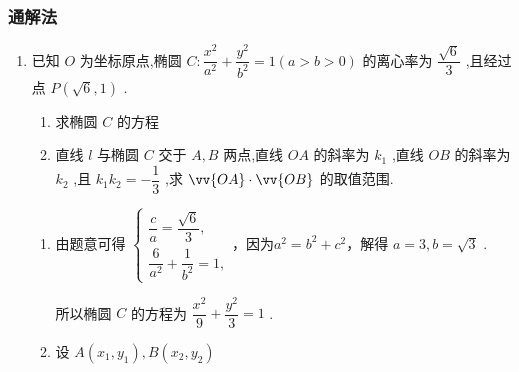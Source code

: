 \subsubsection*{通解法}
\begin{enumerate}
    \item 已知 $O$ 为坐标原点,椭圆 $C : \dfrac{{x}^{2}}{{a}^{2}} + \dfrac{{y}^{2}}{{b}^{2}} = 1\left( {a > b > 0}\right)$ 的离心率为 $\dfrac{\sqrt{6}}{3}$ ,且经过点 $P\left( {\sqrt{6},1}\right)$ .
    \begin{enumerate}
        \item 求椭圆 $C$ 的方程
        \item 直线 $l$ 与椭圆 $C$ 交于 $A,B$ 两点,直线 ${OA}$ 的斜率为 ${k}_{1}$ ,直线 ${OB}$ 的斜率为 ${k}_{2}$ ,且 ${k}_{1}{k}_{2} =  - \dfrac{1}{3}$ ,求 $\vv{OA} \cdot  \vv{OB}$ 的取值范围.
    \end{enumerate}
    \begin{jieda}
        \begin{enumerate}
            \item 由题意可得 $\left\{  \begin{array}{l} \dfrac{c}{a} = \dfrac{\sqrt{6}}{3}, \\  \dfrac{6}{{a}^{2}} + \dfrac{1}{{b}^{2}} = 1, \end{array}\right.$，因为${a}^{2} = {b}^{2} + {c}^{2}$，解得 $a = 3,b = \sqrt{3}$ .
            
            所以椭圆 $C$ 的方程为 $\dfrac{{x}^{2}}{9} + \dfrac{{y}^{2}}{3} = 1$ .
            \item 设 $A\left( {{x}_{1},{y}_{1}}\right) ,B\left( {{x}_{2},{y}_{2}}\right)$
\end{enumerate}
\end{jieda}
\end{enumerate}
